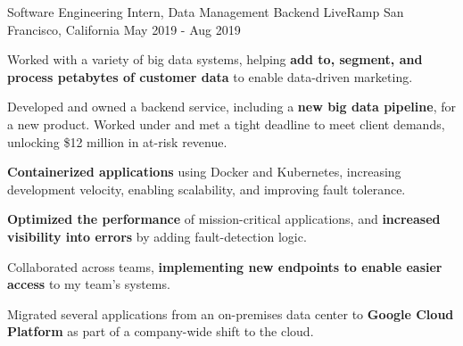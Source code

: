 

\begin{cventries}

    \cventry
      {Software Engineering Intern, Data Management Backend}
      {LiveRamp}
      {San Francisco, California}
      {May 2019 - Aug 2019}
      {
        \begin{cvitems}
          \item Worked with a variety of big data systems, helping \textbf{add to, segment, and process petabytes of customer data} to enable data-driven marketing.
          \item Developed and owned a backend service, including a \textbf{new big data pipeline}, for a new product. Worked under and met a tight deadline to meet client demands, unlocking \$12 million in at-risk revenue.
          \item \textbf{Containerized applications} using Docker and Kubernetes, increasing development velocity, enabling scalability, and improving fault tolerance.         
          \item \textbf{Optimized the performance} of mission-critical applications, and \textbf{increased visibility into errors} by adding fault-detection logic.
          \item Collaborated across teams, \textbf{implementing new endpoints to enable easier access} to my team's systems.
          \item Migrated several applications from an on-premises data center to \textbf{Google Cloud Platform} as part of a company-wide shift to the cloud.
        \end{cvitems}
      }


\end{cventries}
